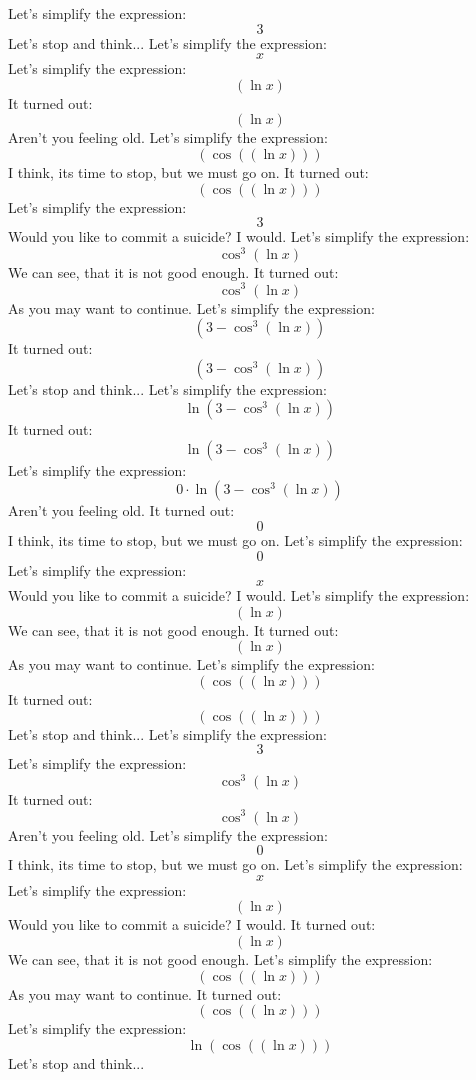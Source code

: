 \documentclass[12pt,a4paper]{scrartcl}
\begin{document}
Let's simplify the expression: $$3$$ Let's stop and think... 
Let's simplify the expression: $$x$$  
Let's simplify the expression: $$ \left(  \ln x \right) $$  
It turned out: $$ \left(  \ln x \right) $$ Aren't you feeling old. 
Let's simplify the expression: $$ \left(  \cos  \left(  \left(  \ln x \right)  \right)  \right) $$ I think, its time to stop, but we must go on. 
It turned out: $$ \left(  \cos  \left(  \left(  \ln x \right)  \right)  \right) $$  
Let's simplify the expression: $$3$$ Would you like to commit a suicide? I would. 
Let's simplify the expression: $$ \cos^{3}  \left(  \ln x \right) $$ We can see, that it is not good enough. 
It turned out: $$ \cos^{3}  \left(  \ln x \right) $$ As you may want to continue. 
Let's simplify the expression: $$ \left( 3- \cos^{3}  \left(  \ln x \right)  \right) $$  
It turned out: $$ \left( 3- \cos^{3}  \left(  \ln x \right)  \right) $$ Let's stop and think... 
Let's simplify the expression: $$ \ln  \left( 3- \cos^{3}  \left(  \ln x \right)  \right) $$  
It turned out: $$ \ln  \left( 3- \cos^{3}  \left(  \ln x \right)  \right) $$  
Let's simplify the expression: $$0 \cdot  \ln  \left( 3- \cos^{3}  \left(  \ln x \right)  \right) $$ Aren't you feeling old. 
It turned out: $$0$$ I think, its time to stop, but we must go on. 
Let's simplify the expression: $$0$$  
Let's simplify the expression: $$x$$ Would you like to commit a suicide? I would. 
Let's simplify the expression: $$ \left(  \ln x \right) $$ We can see, that it is not good enough. 
It turned out: $$ \left(  \ln x \right) $$ As you may want to continue. 
Let's simplify the expression: $$ \left(  \cos  \left(  \left(  \ln x \right)  \right)  \right) $$  
It turned out: $$ \left(  \cos  \left(  \left(  \ln x \right)  \right)  \right) $$ Let's stop and think... 
Let's simplify the expression: $$3$$  
Let's simplify the expression: $$ \cos^{3}  \left(  \ln x \right) $$  
It turned out: $$ \cos^{3}  \left(  \ln x \right) $$ Aren't you feeling old. 
Let's simplify the expression: $$0$$ I think, its time to stop, but we must go on. 
Let's simplify the expression: $$x$$  
Let's simplify the expression: $$ \left(  \ln x \right) $$ Would you like to commit a suicide? I would. 
It turned out: $$ \left(  \ln x \right) $$ We can see, that it is not good enough. 
Let's simplify the expression: $$ \left(  \cos  \left(  \left(  \ln x \right)  \right)  \right) $$ As you may want to continue. 
It turned out: $$ \left(  \cos  \left(  \left(  \ln x \right)  \right)  \right) $$  
Let's simplify the expression: $$ \ln  \left(  \cos  \left(  \left(  \ln x \right)  \right)  \right) $$ Let's stop and think... 
\end{document}
